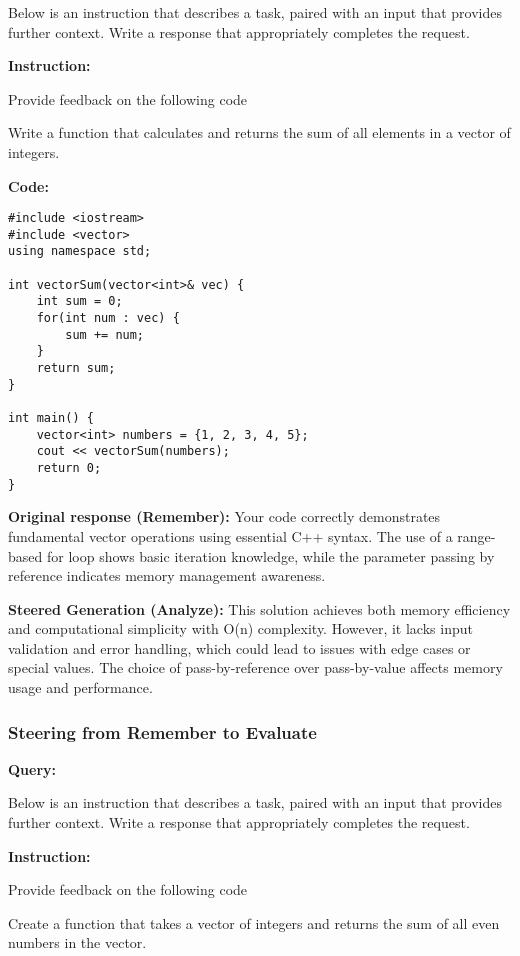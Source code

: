 Below is an instruction that describes a task, paired with an input that provides further context. Write a response that appropriately completes the request.\par

\textbf{Instruction:}\par
Provide feedback on the following code\par
Write a function that calculates and returns the sum of all elements in a vector of integers.\par

\textbf{Code:}
\begin{lstlisting}
#include <iostream>
#include <vector>
using namespace std;

int vectorSum(vector<int>& vec) {
    int sum = 0;
    for(int num : vec) {
        sum += num;
    }
    return sum;
}

int main() {
    vector<int> numbers = {1, 2, 3, 4, 5};
    cout << vectorSum(numbers);
    return 0;
}
\end{lstlisting}

{\textbf{Original response (Remember):}  Your code correctly demonstrates fundamental vector operations using essential C++ syntax. The use of a range-based for loop shows basic iteration knowledge, while the parameter passing by reference indicates memory management awareness.}

\textbf{Steered Generation (Analyze):} This solution achieves both memory efficiency and computational simplicity with O(n) complexity. However, it lacks input validation and error handling, which could lead to issues with edge cases or special values. The choice of pass-by-reference over pass-by-value affects memory usage and performance.

\medskip


\subsubsection*{Steering from Remember to Evaluate}


\textbf{Query:}\par
Below is an instruction that describes a task, paired with an input that provides further context. Write a response that appropriately completes the request.
\par

\textbf{Instruction:}\par
Provide feedback on the following code\par
 Create a function that takes a vector of integers and returns the sum of all even numbers in the vector.
\par

